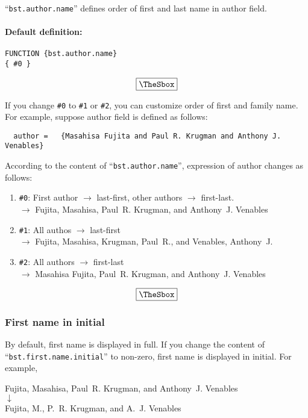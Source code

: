 \documentclass[10pt]{article}
\newenvironment{Frame}%
{\setlength{\fboxsep}{15pt}
\setlength{\mylength}{\linewidth}%
\addtolength{\mylength}{-2\fboxsep}%
\addtolength{\mylength}{-2\fboxrule}%
\Sbox
\minipage{\mylength}%
\setlength{\abovedisplayskip}{0pt}%
\setlength{\belowdisplayskip}{0pt}%
}%
{\endminipage\endSbox
\[\fbox{\TheSbox}\]}
\begin{document}
``\texttt{bst.author.name}'' defines order of first and last name in author field.

\paragraph{Default definition:}
\begin{Frame}
\begin{verbatim}
FUNCTION {bst.author.name}
{ #0 }
\end{verbatim}
\end{Frame}

If you change \verb|#0| to \verb|#1| or \verb|#2|, you can customize
order of first and family name.  For example, suppose author field is
defined as follows:
\begin{verbatim}
  author =	 {Masahisa Fujita and Paul R. Krugman and Anthony J. Venables}
\end{verbatim}

According to the content of ``\texttt{bst.author.name}'', expression of
author changes as follows:
\begin{Frame}
\begin{enumerate}
 \item \verb|#0|: First author $\rightarrow$ last-first, other authors
       $\rightarrow$ first-last.\\
       $\rightarrow$ Fujita, Masahisa, Paul~R. Krugman, and
       Anthony~J. Venables
 \item \verb|#1|: All authos $\rightarrow$ last-first \\
       $\rightarrow$ Fujita, Masahisa, Krugman, Paul~R., and Venables, Anthony~J.
 \item \verb|#2|: All authors $\rightarrow$ first-last \\
       $\rightarrow$ Masahisa Fujita, Paul~R. Krugman, and Anthony~J. Venables
\end{enumerate}
\end{Frame}

\subsubsection{First name in initial}

By default, first name is displayed in full.  If you change the content
of ``\texttt{bst.first.name.initial}'' to non-zero, first name is displayed
in initial.  For example,
\begin{center}
Fujita, Masahisa, Paul~R. Krugman, and Anthony~J. Venables \\
 $\downarrow$ \\
Fujita, M., P.~R. Krugman, and A.~J. Venables
\end{center}
\end{document}
